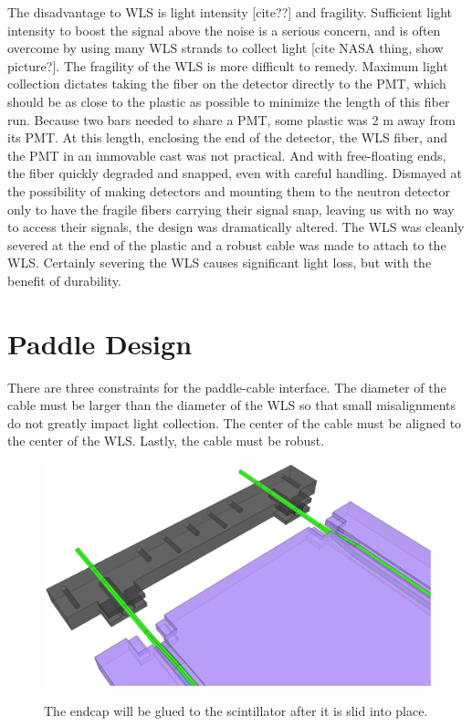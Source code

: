 The disadvantage to WLS is light intensity [cite??] and fragility.  Sufficient light intensity to boost the signal above the noise is a serious concern, and is often overcome by using many WLS strands to collect light [cite NASA thing, show picture?].  The fragility of the WLS is more difficult to remedy.  Maximum light collection dictates taking the fiber on the detector directly to the PMT, which should be as close to the plastic as possible to minimize the length of this fiber run.  Because two bars needed to share a PMT, some plastic was 2 m away from its PMT.  At this length, enclosing the end of the detector, the WLS fiber, and the PMT in an immovable cast was not practical.  And with free-floating ends, the fiber quickly degraded and snapped, even with careful handling.  Dismayed at the possibility of making detectors and mounting them to the neutron detector only to have the fragile fibers carrying their signal snap, leaving us with no way to access their signals, the design was dramatically altered.  The WLS was cleanly severed at the end of the plastic and a robust cable was made to attach to the WLS.  Certainly severing the WLS causes significant light loss, but with the benefit of durability.  

\section{Paddle Design}

There are three constraints for the paddle-cable interface.  The diameter of the cable must be larger than the diameter of the WLS so that small misalignments do not greatly impact light collection.  The center of the cable must be aligned to the center of the WLS.  Lastly, the cable must be robust.

\begin{figure}[ht]
\centering
\includegraphics[width=1.0\textwidth]{figures/veto_assembly.eps}
\label{fig:paddleAssembly}
\caption{The endcap will be glued to the scintillator after it is slid into place.}
\end{figure}

